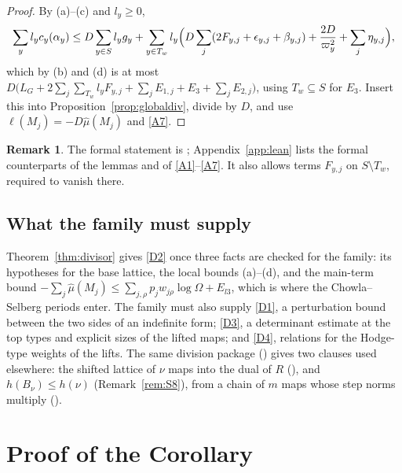 \documentclass[11pt]{amsart}
\theoremstyle{plain}
\theoremstyle{definition}
\newtheorem{remark}[theorem]{Remark}
\numberwithin{equation}{section}
\begin{document}
\begin{proof}
By (a)--(c) and $l_y\ge0$,
\[
\sum_yl_yc_y(\alpha_y)\le D\sum_{y\in S}l_yg_y+\sum_{y\in T_w}l_y\Bigl(D\sum_j(2F_{y,j}+\epsilon_{y,j}+\beta_{y,j})+\frac{2D}{\varpi_y^2}+\sum_j\eta_{y,j}\Bigr),
\]
which by (b) and (d) is at most $D\bigl(L_G+2\sum_j\sum_{T_w}l_yF_{y,j}+\sum_jE_{1,j}+E_3+\sum_jE_{2,j}\bigr)$, using
$T_w\subseteq S$ for $E_3$. Insert this into Proposition~\ref{prop:globaldiv}, divide by $D$, and use
$\ell(M_j)=-D\hat\mu(M_j)$ and \ref{A7}.
\end{proof}

\begin{remark}
The formal statement is ; Appendix~\ref{app:lean} lists the formal counterparts of
the lemmas and of \ref{A1}--\ref{A7}. It also allows terms $F_{y,j}$ on $S\setminus T_w$, required to
vanish there.
\end{remark}

\subsection{What the family must supply}

Theorem~\ref{thm:divisor} gives \ref{D2} once three facts are checked for the family: its
hypotheses for the base lattice, the local bounds (a)--(d), and the main-term bound
$-\sum_j\hat\mu(M_j)\le\sum_{j,\rho}p_jw_{j\rho}\log\Omega+E_{l3}$, which is where the Chowla--Selberg
periods enter. The family must also supply \ref{D1}, a perturbation bound between the two sides of
an indefinite form; \ref{D3}, a determinant estimate at the top types and explicit sizes of the
lifted maps; and \ref{D4}, relations for the Hodge-type weights of the lifts. The same division
package () gives two clauses used elsewhere: the shifted lattice of $\nu$ maps into
the dual of $R$ (), and $h(B_\nu)\le h(\nu)$ (Remark~\ref{rem:S8}), from a chain of $m$ maps whose
step norms multiply ().
\section{Proof of the Corollary}\label{sec:GRH}
\end{document}
